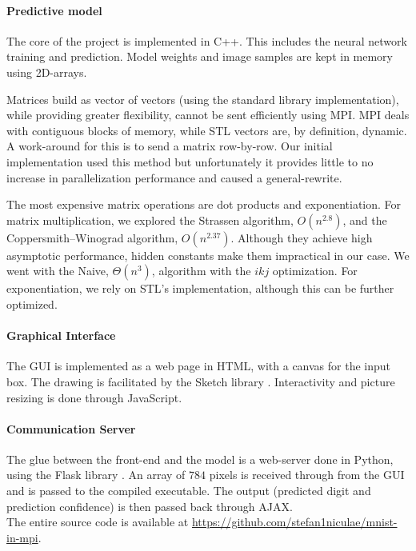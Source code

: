 \documentclass[a4paper]{article}
\begin{document}
\paragraph{Predictive model} The core of the project is implemented in C++. This includes the neural network training and prediction. Model weights and image samples are kept in memory using 2D-arrays. 

Matrices build as vector of vectors (using the standard library implementation), while providing greater flexibility, cannot be sent efficiently using MPI. MPI deals with contiguous blocks of memory, while STL vectors are, by definition, dynamic. A work-around for this is to send a matrix row-by-row. Our initial implementation used this method but unfortunately it provides little to no increase in parallelization performance and caused a general-rewrite. 

The most expensive matrix operations are dot products and exponentiation. For matrix multiplication, we explored the Strassen algorithm, $O(n^{2.8})$, and the Coppersmith–Winograd algorithm, $O(n^{2.37})$. Although they achieve high asymptotic performance, hidden constants make them impractical in our case. We went with the Naive, $\Theta(n^3)$, algorithm with the $ikj$ optimization. For exponentiation, we rely on STL's implementation, although this can be further optimized.

\paragraph{Graphical Interface} The GUI is implemented as a web page in HTML, with a canvas for the input box.
The drawing is facilitated by the Sketch library \cite{sketch}. Interactivity and picture resizing is done through JavaScript.

\paragraph{Communication Server} The glue between the front-end and the model is a web-server done in Python, using the Flask library \cite{flask}. An array of $784$ pixels is received through from the GUI and is passed to the compiled executable. The output (predicted digit and prediction confidence) is then passed back through AJAX.
\\

\noindent The entire source code is available at \url{https://github.com/stefan1niculae/mnist-in-mpi}.

\vspace{\fill} %

    
    
\end{document}
